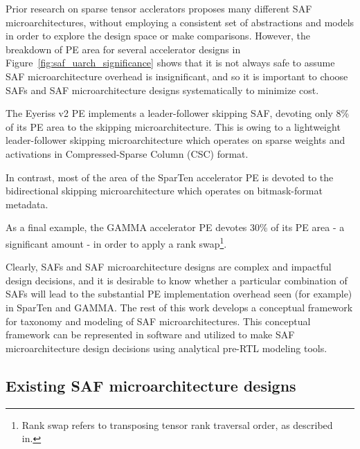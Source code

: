 Prior research on sparse tensor acclerators proposes many different SAF microarchitectures, without employing a consistent set of abstractions and models in order to explore the design space or make comparisons. However, the breakdown of PE area for several accelerator designs in Figure~\ref{fig:saf_uarch_significance} shows that it is not always safe to assume SAF microarchitecture overhead is insignificant, and so it is important to choose SAFs and SAF microarchitecture designs systematically to minimize cost.

The Eyeriss v2\cite{eyerissv2} PE implements a leader-follower skipping SAF, devoting only 8\% of its PE area to the skipping microarchitecture. This is owing to a lightweight leader-follower skipping microarchitecture which operates on sparse weights and activations in Compressed-Sparse Column (CSC) format. 

In contrast, most of the area of the SparTen\cite{sparten} accelerator PE is devoted to the bidirectional skipping microarchitecture which operates on bitmask-format metadata.

As a final example, the GAMMA\cite{gamma} accelerator PE devotes 30\% of its PE area - a significant amount - in order to apply a rank swap\footnote{Rank swap refers to transposing tensor rank traversal order, as described in\cite{sparse_arch_lecture1}.}. 

Clearly, SAFs and SAF microarchitecture designs are complex and impactful design decisions, and it is desirable to know whether a particular combination of SAFs will lead to the substantial PE implementation overhead seen (for example) in SparTen and GAMMA. The rest of this work develops a conceptual framework for taxonomy and modeling of SAF microarchitectures. This conceptual framework can be represented in software and utilized to make SAF microarchitecture design decisions using analytical pre-RTL modeling tools.

\subsection{Existing SAF microarchitecture designs}


